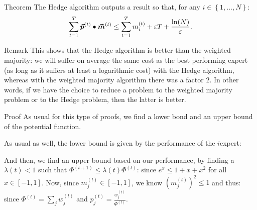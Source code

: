 \documentclass[a4paper]{article}
\begin{document}
\begin{parag}{Theorem}
    The Hedge algorithm outputs a result so that, for any $i \in \left\{1, \ldots, N\right\}$: 
    \[\sum_{t=1}^{T} \bvec{p}^{\left(t\right)} \dotprod \bvec{m}^{\left(t\right)} \leq \sum_{t=1}^{T} m_i^{\left(t\right)} + \epsilon T + \frac{\ln\left(N\right)}{\epsilon}.\]
    
    \begin{subparag}{Remark}
        This shows that the Hedge algorithm is better than the weighted majority: we will suffer on average the same cost as the best performing expert (as long as it suffers at least a logarithmic cost) with the Hedge algorithm, whereas with the weighted majority algorithm there was a factor $2$. In other words, if we have the choice to reduce a problem to the weighted majority problem or to the Hedge problem, then the latter is better.
    \end{subparag}

    \begin{subparag}{Proof}
        As usual for this type of proofs, we find a lower bond and an upper bound of the potential function.

        As usual as well, the lower bound is given by the performance of the $i$\Th expert:

        And then, we find an upper bound based on our performance, by finding a $\lambda\left(t\right) < 1$ such that $\Phi^{\left(t+1\right)} \leq \lambda\left(t\right) \Phi^{\left(t\right)}$: 
       since $e^x \leq 1 + x + x^2$ for all $x \in \left[-1, 1\right]$. Now, since $m_j^{\left(t\right)} \in \left[-1, 1\right]$, we know $\left(m_j^{\left(t\right)}\right)^2 \leq 1$ and thus: 
        since $\Phi^{\left(t\right)} = \sum_{j} w_j^{\left(t\right)}$ and $p_j^{\left(t\right)} = \frac{w_j^{\left(t\right)}}{\Phi^{\left(t\right)}}$.


\end{subparag}
\end{parag}
\end{document}
